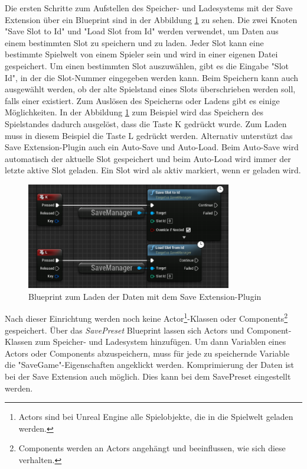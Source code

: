 Die ersten Schritte zum Aufstellen des Speicher- und Ladesystems mit der Save Extension über ein Blueprint sind in der Abbildung \ref{fig:unrealSaveExtensionBlueprint} zu sehen. Die zwei Knoten "Save Slot to Id" und "Load Slot from Id" werden verwendet, um Daten aus einem bestimmten Slot zu speichern und zu laden. Jeder Slot kann eine bestimmte Spielwelt von einem Spieler sein und wird in einer eigenen Datei gespeichert.\cite{piperiftPiperiftSaveSlot} Um einen bestimmten Slot auszuwählen, gibt es die Eingabe "Slot Id", in der die Slot-Nummer eingegeben werden kann. Beim Speichern kann auch ausgewählt werden, ob der alte Spielstand eines Slots überschrieben werden soll, falls einer existiert. Zum Auslösen des Speicherns oder Ladens gibt es einige Möglichkeiten. In der Abbildung \ref{fig:unrealSaveExtensionBlueprint} zum Beispiel wird das Speichern des Spielstandes dadurch ausgelöst, dass die Taste K gedrückt wurde. Zum Laden muss in diesem Beispiel die Taste L gedrückt werden. Alternativ unterstüzt das Save Extension-Plugin auch ein Auto-Save und Auto-Load. Beim Auto-Save wird automatisch der aktuelle Slot gespeichert und beim Auto-Load wird immer der letzte aktive Slot geladen. Ein Slot wird als aktiv markiert, wenn er geladen wird.\cite{piperiftPiperiftSaveSlot}\cite{piperiftPiperiftSaveBlueprint} 

\begin{figure}[htp]
    \centering
    \includegraphics[width=0.8\textwidth]{images/SaveExtension_load_save_blueprint.png}
    \caption{Blueprint zum Laden der Daten mit dem Save Extension-Plugin \cite{piperiftPiperiftSaveBlueprint}}
    \label{fig:unrealSaveExtensionBlueprint}
\end{figure}

Nach dieser Einrichtung werden noch keine Actor\footnote{Actors sind bei Unreal Engine alle Spielobjekte, die in die Spielwelt geladen werden.\cite{unrealengineActors}}-Klassen oder Components\footnote{Components werden an Actors angehängt und beeinflussen, wie sich diese verhalten.\cite{unrealengineActors}} gespeichert. Über das \textit{SavePreset} Blueprint lassen sich Actors und Component-Klassen zum Speicher- und Ladesystem hinzufügen. Um dann Variablen eines Actors oder Components abzuspeichern, muss für jede zu speichernde Variable die "SaveGame"-Eigenschaften angeklickt werden. Komprimierung der Daten ist bei der Save Extension auch möglich. Dies kann bei dem SavePreset eingestellt werden.

